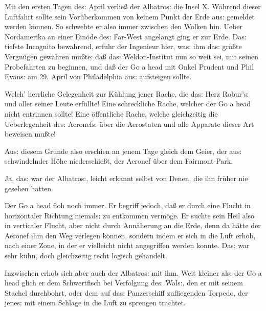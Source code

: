 \documentclass[oneside,12pt]{book}
\newenvironment{antiqua}{\normalfont}{}
\newcommand{\s}{s:}
\begin{document}
Mit den ersten Tagen de{\s} April verlie{\ss} der
{\glqq}Albatro{\s}{\grqq} die Insel X. W\"ahrend dieser Luftfahrt
sollte sein Vor\"uberkommen von keinem Punkt der Erde au{\s} gemeldet
werden k\"onnen. So schwebte er also immer zwischen den Wolken hin.
Ueber Nordamerika an einer Ein\"ode de{\s} Far-West angelangt ging er
zur Erde. Da{\s} tiefste Incognito bewahrend, erfuhr der Ingenieur
hier, wa{\s} ihm da{\s} gr\"o{\ss}te Vergn\"ugen gew\"ahren
mu{\ss}te: da{\ss} da{\s} Weldon-Institut nun so weit sei, mit seinen
Probefahrten zu beginnen, und da{\ss} der \begin{antiqua}Go a
head\end{antiqua} mit Onkel Prudent und Phil Evan{\s} am 29. April
von Philadelphia au{\s} aufsteigen sollte.

Welch' herrliche Gelegenheit zur K\"uhlung jener Rache, die da{\s}
Herz Robur'{\s} und aller seiner Leute erf\"ullte! Eine schreckliche
Rache, welcher der \begin{antiqua}Go a head\end{antiqua} nicht
entrinnen sollte! Eine \"offentliche Rache, welche gleichzeitig die
Ueberlegenheit de{\s} Aeronef{\s} \"uber die Aerostaten und alle
Apparate dieser Art beweisen mu{\ss}te!

Au{\s} diesem Grunde also erschien an jenem Tage gleich dem Geier,
der au{\s} schwindelnder H\"ohe niederschie{\ss}t, der Aeronef \"uber
dem Fairmont-Park.

Ja, da{\s} war der {\glqq}Albatro{\s}{\grqq}, leicht erkannt selbst
von Denen, die ihn fr\"uher nie gesehen hatten.

Der \begin{antiqua}Go a head\end{antiqua} floh noch immer. Er begriff
jedoch, da{\ss} er durch eine Flucht in horizontaler Richtung
niemal{\s} zu entkommen verm\"oge. Er suchte sein Heil also in
verticaler Flucht, aber nicht durch Ann\"aherung an die Erde, denn da
h\"atte der Aeronef ihm den Weg verlegen k\"onnen, sondern indem er
sich in die Luft erhob, nach einer Zone, in der er vielleicht nicht
angegriffen werden konnte. Da{\s} war sehr k\"uhn, doch gleichzeitig
recht logisch gehandelt.

Inzwischen erhob sich aber auch der {\glqq}Albatro{\s}{\grqq} mit
ihm. Weit kleiner al{\s} der \begin{antiqua}Go a head\end{antiqua}
glich er dem Schwertfisch bei Verfolgung de{\s} Wal{\s}, den er mit
seinem Stachel durchbohrt, oder dem auf da{\s} Panzerschiff
zufliegenden Torpedo, der jene{\s} mit einem Schlage in die Luft zu
sprengen trachtet.
\end{document}
